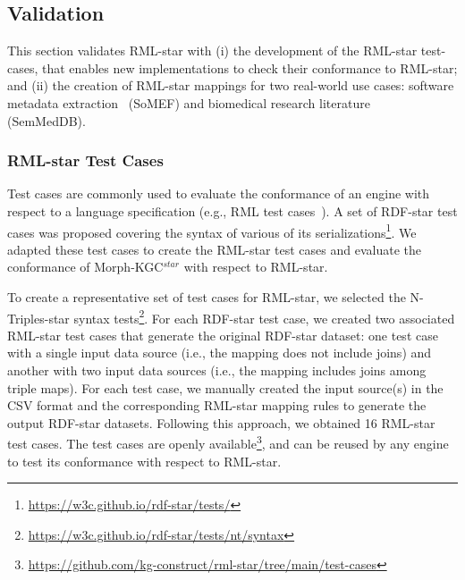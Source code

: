 \subsection{Validation}
\label{sec:chp4_validation}

This section validates RML-star with (i) the development of the RML-star test-cases, that enables new implementations to check their conformance to RML-star; and (ii) the creation of RML-star mappings for two real-world use cases: software metadata extraction~\parencite{kelley2021framework} (SoMEF) and biomedical research literature~\parencite{SemMedDB} (SemMedDB). 




\subsubsection{RML-star Test Cases}
\label{sec:chp4_star_testcases}

Test cases are commonly used %
to evaluate the conformance of an engine with respect to a language specification (e.g., RML test cases~\parencite{heyvaert2019conformance}). 
A set of \mbox{RDF-star} test cases was proposed
covering the syntax of various of its serializations\footnote{\url{https://w3c.github.io/rdf-star/tests/}}.
We adapted these test cases to create the RML-star test cases and evaluate the conformance of \mbox{Morph-KGC$^{star}$}
with respect to \mbox{RML-star}.

To create a representative set of test cases for \mbox{RML-star}, we selected the N-Triples-star syntax tests\footnote{\url{https://w3c.github.io/rdf-star/tests/nt/syntax}}.  %
For each \mbox{RDF-star} test case, we created two associated \mbox{RML-star} test cases that generate the original \mbox{RDF-star} dataset: one test case with a single input data source (i.e., the mapping does not include joins) and another with two input data sources (i.e., the mapping includes joins among triple maps).
For each test case, we manually created the input source(s) in the CSV format and the corresponding \mbox{RML-star} mapping rules to generate the output \mbox{RDF-star} datasets.
Following this approach, we obtained 16 \mbox{RML-star} test cases.
The test cases are openly available\footnote{\url{https://github.com/kg-construct/rml-star/tree/main/test-cases}},
and can be reused by any engine to test its conformance with respect to \mbox{RML-star}.



